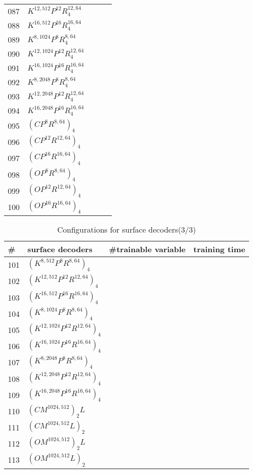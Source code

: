 \begin{appendices}
\begin{table*}
\begin{tabular}{|l | l | l | l }
		087&$K^{12,512}P^{12}R^{12,64}_4$ &~&~\\
		088&$K^{16,512}P^{16}R^{16,64}_4$ &~&~\\
		089&$K^{8,1024}P^{8}R^{8,64}_4$ &~&~\\
		090&$K^{12,1024}P^{12}R^{12,64}_4$ &~&~\\
		091&$K^{16,1024}P^{16}R^{16,64}_4$ &~&~\\
		092&$K^{8,2048}P^{8}R^{8,64}_4$ &~&~\\
		093&$K^{12,2048}P^{12}R^{12,64}_4$ &~&~\\
		094&$K^{16,2048}P^{16}R^{16,64}_4$ &~&~\\
		095&$(CP^8R^{8,64})_4$ &~&~\\
		096&$(CP^{12}R^{12,64})_4$ &~&~\\
		097&$(CP^{16}R^{16,64})_4$ &~&~\\
		098&$(OP^8R^{8,64})_4$ &~&~\\
		099&$(OP^{12}R^{12,64})_4$ &~&~\\
		100&$(OP^{16}R^{16,64})_4$ &~&~\\
	\end{tabular}
\end{table*}
\begin{table*}
	\caption{Configurations for surface decoders(3/3)}
	\label{tab:surf_dec3}
	\centering
	\begin{tabular}{| l | l | l | l}
		\hline
		\hline
		\#&surface decoders & \#trainable variable & training time \\
		\hline
		101&$(K^{8,512}P^{8}R^{8,64})_4$ &~&~\\
		102&$(K^{12,512}P^{12}R^{12,64})_4$ &~&~\\
		103&$(K^{16,512}P^{16}R^{16,64})_4$ &~&~\\
		104&$(K^{8,1024}P^{8}R^{8,64})_4$ &~&~\\
		105&$(K^{12,1024}P^{12}R^{12,64})_4$ &~&~\\
		106&$(K^{16,1024}P^{16}R^{16,64})_4$ &~&~\\
		107&$(K^{8,2048}P^{8}R^{8,64})_4$ &~&~\\
		108&$(K^{12,2048}P^{12}R^{12,64})_4$ &~&~\\
		109&$(K^{16,2048}P^{16}R^{16,64})_4$ &~&~\\
		\hline
		110&$(CM^{1024,512})_2L$ &~&~\\
		111&$(CM^{1024,512}L)_2$ &~&~\\
		112&$(OM^{1024,512})_2L$ &~&~\\
		113&$(OM^{1024,512}L)_2$ &~&~\\

\end{tabular}
\end{table*}
\end{appendices}
